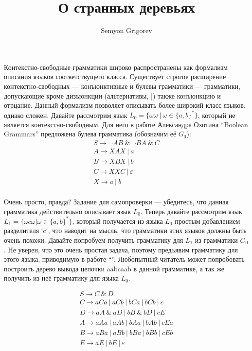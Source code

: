 \documentclass[12pt]{article}  %
\title{О странных деревьях}
\author{Semyon Grigorev}
\theoremstyle{definition}
\theoremstyle{remark}
\begin{document}
\maketitle

Контекстно-свободные грамматики широко распространены как формализм описания языков соответствущего 
класса. 
Существует строгое расширение контекстно-свободных --- конъюнктивные и булевы грамматики --- грамматики, допускающие кроме  дизъюнкции (альтернативы, |) также конъюнкцию и отрцание.
Данный формализм позволяет описывать более широкий класс языков, однако сложен. 
Давайте рассмотрим язык $L_0 = \{\omega \omega \ | \ \omega \in \{a,b\}^*\}$, который не является контекстно-свободным.
Для него в работе Александра Охотина ``Boolean Grammars'' предложена булева грамматика (обозначим её $G_0$):
$$
\begin{array}{l}
S \rightarrow  \neg A B \ \& \ \neg B A \ \& \ C \\
A \rightarrow  X A X \ | \ a  \\
B \rightarrow  X B X \ | \ b  \\
C \rightarrow  X X C \ | \ \varepsilon \\
X \rightarrow  a \ | \ b  \\
\end{array}
$$

Очень просто, правда? 
Задание для самопроверки — убедитесь, что данная грамматика действительно описывает язык $L_0$.
Теперь давайте рассмотрим язык $L_1 = \{\omega c \omega | \omega \in \{a,b\}^*\}$, который получается из языка $L_0$ простым добавлением разделителя `c`, что наводит на мысль, что грамматики этих языков должны быть очень похожи.
Давайте попробуем получить грамматику для $L_1$ из грамматики $G_0$.
Не уверен, что это очень простая задача, поэтому предъявим грамматику для этого языка, приводимую в работе “”. 
Любопытный читатель может попробовать построить дерево вывода цепочки aabcaab в данной грамматике, а так же получить из неё грамматику для языка $L_0$. 

$$
\begin{array}{l}
S \rightarrow C \ \& \ D \\
C \rightarrow a C a \ | \ a C b \ | \ b C a \ | \ b C b \ | \ c  \\
D \rightarrow a A \ \& \ a D \ | \ b B \ \& \ b D \ | \ c E  \\
A \rightarrow a A a \ | \ a A b \ | \ b A a \ | \ b A b \ | \ c E a  \\
B \rightarrow a B a \ | \ a B b \ | \ b B a \ | \ b B b \ | \ c E b \\
E \rightarrow a E \ | \ b E \ | \ \varepsilon                \\
\end{array}
$$
\end{document}
